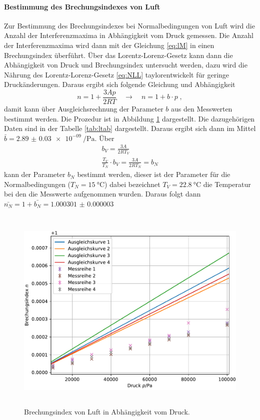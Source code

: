 \paragraph{Bestimmung des Brechungsindexes von Luft}
Zur Bestimmung des Brechungsindexes bei Normalbedingungen von Luft wird die Anzahl der Interferenzmaxima 
in Abhängigkeit vom Druck gemessen. Die Anzahl der Interferenzmaxima wird dann mit der Gleichung 
\eqref{eq:lM} in einen Brechungsindex überführt. Über das Lorentz-Lorenz-Gesetz kann dann die 
Abhängigkeit von Druck und Brechungsindex untersucht werden, dazu wird die Nährung des Lorentz-Lorenz-Gesetz 
\eqref{eq:NLL} taylorentwickelt für geringe Druckänderungen. 
Daraus ergibt sich folgende Gleichung und Abhängigkeit
\begin{equation}
n = 1 + \frac{3Ap}{2RT} \quad \rightarrow \quad n = 1+ b \cdot p \; ,
\label{eq:brechl}
\end{equation}
damit kann über Ausgleichsrechnung der Parameter $b$ aus den Messwerten bestimmt werden. 
Die Prozedur ist in Abbildung \ref{fig:Lplot} dargestellt. 
Die dazugehörigen Daten sind in der Tabelle \ref{tab:ltab} dargestellt. 
Daraus ergibt sich dann im Mittel $ \bar{b} = \SI{2.89(3)e-09}{\per\Pa}$. 
Über 
\begin{gather}
b_V =  \frac{3A}{2RT_V} \\
\frac{T_V}{T_N} \cdot b_V =\frac{3A}{2RT_N} = b_N
\end{gather}
kann der Parameter $b_N$ bestimmt werden, dieser ist der Parameter für die Normalbedingungen 
($T_N = \SI{15}{\celsius}$) dabei bezeichnet $T_V = \SI{22,8}{\celsius}$ die Temperatur bei den die 
Messwerte aufgenommen wurden. 
Daraus folgt dann $ \bar{n_{N}} = 1 +  \bar{b_{N}} = \SI{1.000301(3)}{}$
\begin{figure}
  \centering
  \includegraphics[height = 10cm]{plots/Luftplot.pdf}
  \caption{Brechungsindex von Luft in Abhängigkeit vom Druck.}
  \label{fig:Lplot}
\end{figure}

